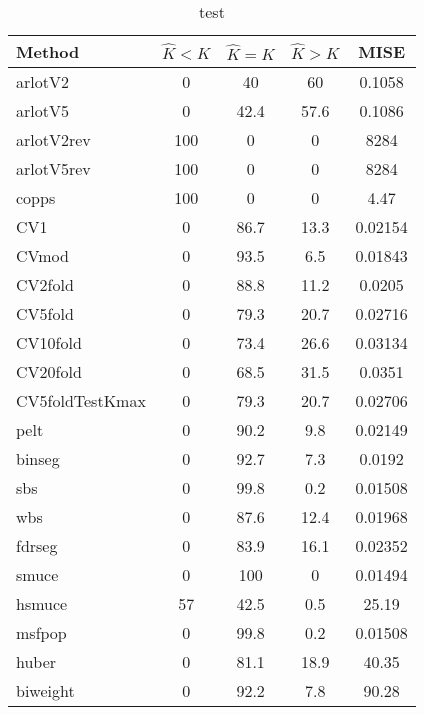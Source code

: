 \begin{table}[ht]
\centering
\begin{tabular}{l|cccc}
  \hline
Method & $\hat{K} < K$ & $\hat{K} = K$ & $\hat{K} > K$ & MISE \\ 
  \hline
arlotV2 &     0 &    40 &    60 & 0.1058 \\ 
  arlotV5 &     0 &  42.4 &  57.6 & 0.1086 \\ 
  arlotV2rev &   100 &     0 &     0 &  8284 \\ 
  arlotV5rev &   100 &     0 &     0 &  8284 \\ 
  copps &   100 &     0 &     0 &  4.47 \\ 
  CV1 &     0 &  86.7 &  13.3 & 0.02154 \\ 
  CVmod &     0 &  93.5 &   6.5 & 0.01843 \\ 
  CV2fold &     0 &  88.8 &  11.2 & 0.0205 \\ 
  CV5fold &     0 &  79.3 &  20.7 & 0.02716 \\ 
  CV10fold &     0 &  73.4 &  26.6 & 0.03134 \\ 
  CV20fold &     0 &  68.5 &  31.5 & 0.0351 \\ 
  CV5foldTestKmax &     0 &  79.3 &  20.7 & 0.02706 \\ 
  pelt &     0 &  90.2 &   9.8 & 0.02149 \\ 
  binseg &     0 &  92.7 &   7.3 & 0.0192 \\ 
  sbs &     0 &  99.8 &   0.2 & 0.01508 \\ 
  wbs &     0 &  87.6 &  12.4 & 0.01968 \\ 
  fdrseg &     0 &  83.9 &  16.1 & 0.02352 \\ 
  smuce &     0 &   100 &     0 & 0.01494 \\ 
  hsmuce &    57 &  42.5 &   0.5 & 25.19 \\ 
  msfpop &     0 &  99.8 &   0.2 & 0.01508 \\ 
  huber &     0 &  81.1 &  18.9 & 40.35 \\ 
  biweight &     0 &  92.2 &   7.8 & 90.28 \\ 
   \hline
\end{tabular}
\caption{test} 
\end{table}
